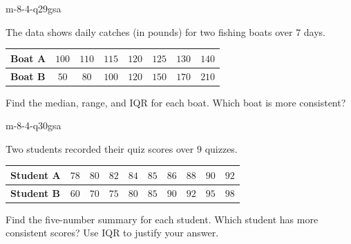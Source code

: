 \begin{practiceQuestion}{m-8-4-q29}{gsa}
\begin{questionText}
The data shows daily catches (in pounds) for two fishing boats over $7$ days.

\begin{center}
\begin{tabular}{|l|c|c|c|c|c|c|c|}
\hline
\textbf{Boat A} & $100$ & $110$ & $115$ & $120$ & $125$ & $130$ & $140$ \\
\hline
\textbf{Boat B} & $50$ & $80$ & $100$ & $120$ & $150$ & $170$ & $210$ \\
\hline
\end{tabular}
\end{center}

Find the median, range, and IQR for each boat. Which boat is more consistent?
\end{questionText}
\end{practiceQuestion}

\begin{practiceQuestion}{m-8-4-q30}{gsa}
\begin{questionText}
Two students recorded their quiz scores over $9$ quizzes.

\begin{center}
\begin{tabular}{|l|c|c|c|c|c|c|c|c|c|}
\hline
\textbf{Student A} & $78$ & $80$ & $82$ & $84$ & $85$ & $86$ & $88$ & $90$ & $92$ \\
\hline
\textbf{Student B} & $60$ & $70$ & $75$ & $80$ & $85$ & $90$ & $92$ & $95$ & $98$ \\
\hline
\end{tabular}
\end{center}

Find the five-number summary for each student. Which student has more consistent scores? Use IQR to justify your answer.
\end{questionText}
\end{practiceQuestion}
